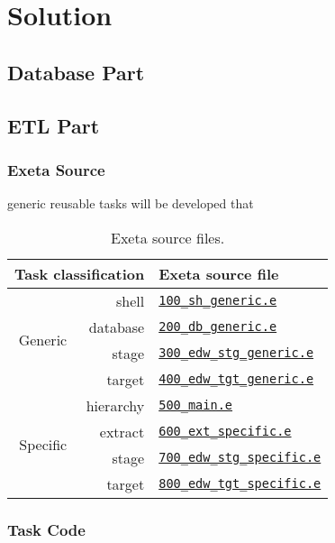 \documentclass[a4paper,12pt,english,oneside]{book}
\newcommand{\exeta}{Exeta\xspace}
\begin{document}
\section{Solution}

\subsection{Database Part}

\subsection{ETL Part}

\subsubsection{\exeta Source}

generic reusable tasks will be developed that 

\begin{table}%
\centering%
\begin{tabular}{r|r|l}%
\toprule%
\multicolumn{2}{r|}{\bf Task classification} & \bf \exeta source file \\
\midrule
\multirow{4}{*}{Generic}
  &     shell & \href{file:../tutorial/rep/100_sh_generic.e}{\tt 100\_sh\_generic.e} \\
  &  database & \href{file:../tutorial/rep/200_db_generic.e}{\tt 200\_db\_generic.e} \\
  &     stage & \href{file:../tutorial/rep/300_edw_stg_generic.e}{\tt 300\_edw\_stg\_generic.e} \\
  &    target & \href{file:../tutorial/rep/400_edw_tgt_generic.e}{\tt 400\_edw\_tgt\_generic.e} \\
\midrule
\multirow{4}{*}{Specific}
  & hierarchy & \href{file:../tutorial/rep/500_main.e}{\tt 500\_main.e} \\
  &   extract & \href{file:../tutorial/rep/600_ext_specific.e}{\tt 600\_ext\_specific.e} \\
  &     stage & \href{file:../tutorial/rep/700_edw_stg_specific.e}{\tt 700\_edw\_stg\_specific.e} \\
  &    target & \href{file:../tutorial/rep/800_edw_tgt_specific.e}{\tt 800\_edw\_tgt\_specific.e} \\
\bottomrule
\end{tabular}
\caption{\exeta source files.}
\end{table}

\subsubsection{Task Code}
\end{document}
